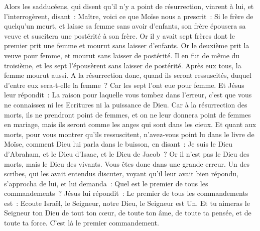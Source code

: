 \begin{multicols}{2}
Alors les sadducéens, qui disent qu'il n'y a point de résurrection, vinrent à lui, et l'interrogèrent, disant~:
Maître, voici ce que Moïse nous a prescrit~: Si le frère de quelqu'un meurt, et laisse sa femme sans avoir d'enfants, son frère épousera sa veuve et suscitera une postérité à son frère.
Or il y avait sept frères dont le premier prit une femme et mourut sans laisser d'enfants.
Or le deuxième prit la veuve pour femme, et mourut sans laisser de postérité. Il en fut de même du troisième,
et les sept l'épousèrent sans laisser de postérité. Après eux tous, la femme mourut aussi.
A la résurrection donc, quand ils seront ressuscités, duquel d'entre eux sera-t-elle la femme~? Car les sept l'ont eue pour femme.
Et Jésus leur répondit~: La raison pour laquelle vous tombez dans l'erreur, c'est que vous ne connaissez ni les Ecritures ni la puissance de Dieu.
Car à la résurrection des morts, ils ne prendront point de femmes, et on ne leur donnera point de femmes en mariage, mais ils seront comme les anges qui sont dans les cieux.
Et quant aux morts, pour vous montrer qu'ils ressuscitent, n'avez-vous point lu dans le livre de Moïse, comment Dieu lui parla dans le buisson, en disant~: Je suis le Dieu d'Abraham, et le Dieu d'Isaac, et le Dieu de Jacob~?
Or il n'est pas le Dieu des morts, mais le Dieu des vivants. Vous êtes donc dans une grande erreur.
Un des scribes, qui les avait entendus discuter, voyant qu'il leur avait bien répondu, s'approcha de lui, et lui demanda~: Quel est le premier de tous les commandements~?
Jésus lui répondit~: Le premier de tous les commandements est~: Ecoute Israël, le Seigneur, notre Dieu, le Seigneur est Un.
Et tu aimeras le Seigneur ton Dieu de tout ton cœur, de toute ton âme, de toute ta pensée, et de toute ta force. C'est là le premier commandement.

\end{multicols}
